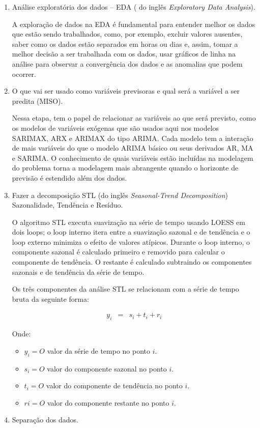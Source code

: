     \begin{enumerate}[start=1, label = {\textbf{Etapa} \arabic* } ]
    	\item Análise exploratória dos dados – EDA ( do inglês \textit{Exploratory Data Analysis}). \label{etp:1}
    	
    	A exploração de dados na EDA é fundamental para entender melhor os dados que estão sendo trabalhados, como, por exemplo, excluir valores ausentes, saber como os dados estão separados em horas ou dias e, assim, tomar a melhor decisão a ser trabalhada com os dados, usar gráficos de linha na análise para observar a convergência dos dados e as anomalias que podem ocorrer.
    	
        	
    	\item O que vai ser usado como variáveis previsoras e qual será a variável a ser predita (MISO). \label{etp:2}
    	
    	Nessa etapa, tem o papel de relacionar as variáveis ao que será previsto, como os modelos de variáveis exógenas que são usados aqui nos modelos SARIMAX, ARX e ARIMAX do tipo ARIMA. Cada modelo tem a interação de mais variáveis do que o modelo ARIMA básico ou seus derivados AR, MA e SARIMA. O conhecimento de quais variáveis estão incluídas na modelagem do problema torna a modelagem mais abrangente quando o horizonte de previsão é estendido além dos dados.
    	
       	
    	\item Fazer a decomposição STL (do inglês \textit{Seasonal-Trend Decomposition}) Sazonalidade, Tendência e Resíduo. \label{etp:3}
    	
        O algoritmo STL executa suavização na série de tempo usando LOESS em dois loops; o loop interno itera entre a suavização sazonal e de tendência e o loop externo minimiza o efeito de valores atípicos. Durante o loop interno, o componente sazonal é calculado primeiro e removido para calcular o componente de tendência. O restante é calculado subtraindo os componentes sazonais e de tendência da série de tempo.
        
        Os três componentes da análise STL se relacionam com a série de tempo bruta da seguinte forma:
        
        \begin{eqnarray}
        	y_i &=& s_i + t_i + r_i
        \end{eqnarray}
    	
    	Onde:
    	
    	\begin{itemize}
    		\item $y_i = O$ valor da série de tempo no ponto $i$.
    		\item $s_i = O$ valor do componente sazonal no ponto $i$.
    		\item $t_i = O$ valor do componente de tendência no ponto $i$.
    		\item $ri = O$ valor do componente restante no ponto $i$.
    	\end{itemize}
    	\item \label{etp:4} Separação dos dados.
    	

\end{enumerate}
